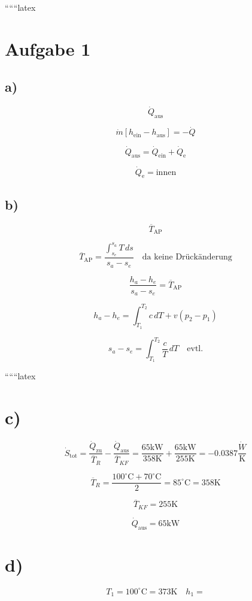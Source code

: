 
``````latex


\section*{Aufgabe 1}

\subsection*{a)}

\[
\dot{Q}_{\text{aus}}
\]

\[
\dot{m} \left[ h_{\text{ein}} - h_{\text{aus}} \right] = -\dot{Q}
\]

\[
\dot{Q}_{\text{aus}} = \dot{Q}_{\text{ein}} + \dot{Q}_{\text{e}}
\]

\[
\dot{Q}_{\text{e}} = \text{innen}
\]

\subsection*{b)}

\[
\overline{T}_{\text{AP}}
\]

\[
\overline{T}_{\text{AP}} = \frac{\int_{s_e}^{s_a} T \, ds}{s_a - s_e} \quad \text{da keine Drückänderung}
\]

\[
\frac{h_a - h_e}{s_a - s_e} = \overline{T}_{\text{AP}}
\]

\[
h_a - h_e = \int_{T_1}^{T_2} c \, dT + v(p_2 - p_1)
\]

\[
s_a - s_e = \int_{T_1}^{T_2} \frac{c}{T} \, dT \quad \text{evtl.}
\]

``````latex

\section*{c)}
\[
\dot{S}_{\text{tot}} = \frac{\dot{Q}_{\text{zu}}}{\overline{T}_{R}} - \frac{\dot{Q}_{\text{aus}}}{\overline{T}_{KF}} = \frac{65 \text{kW}}{358 \text{K}} + \frac{65 \text{kW}}{255 \text{K}} = -0.0387 \frac{\dot{W}}{\text{K}}
\]

\[
\overline{T}_{R} = \frac{100^\circ \text{C} + 70^\circ \text{C}}{2} = 85^\circ \text{C} = 358 \text{K}
\]

\[
\overline{T}_{KF} = 255 \text{K}
\]

\[
\dot{Q}_{\text{aus}} = 65 \text{kW}
\]

\section*{d)}
\[
T_1 = 100^\circ \text{C} = 373 \text{K} \quad h_1 =
\]

